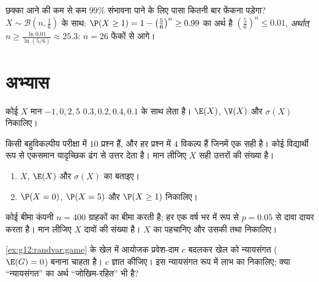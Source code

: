 \begin{example}\label{ex:g12:randvar:atleastone}
छक्का आने की कम से कम $99\%$ संभावना पाने के लिए पासा कितनी बार फेंकना पड़ेगा?
$X \sim \mathcal B\left(n, \frac16\right)$ के साथ: $\P(X \geq 1) = 1 - \left(\frac56\right)^n \geq 0.99$ का अर्थ है $\left(\frac56\right)^n \leq 0.01$, \emph{अर्थात्} $n \geq \frac{\ln 0.01}{\ln(5/6)} \approx 25.3$: $n = 26$ फेंकों से आगे।
\end{example}

\section{अभ्यास}

\begin{exercise}[$\star$]\label{exo:g12:randvar:1}
कोई  $X$ मान $-1, 0, 2, 5$  $0.3, 0.2, 0.4, 0.1$ के साथ लेता है। $\E(X)$, $\V(X)$
और $\sigma(X)$ निकालिए।
\end{exercise}

\begin{exercise}[$\star$]\label{exo:g12:randvar:2}
किसी बहुविकल्पीय परीक्षा में $10$ प्रश्न हैं, और हर प्रश्न में $4$ विकल्प
हैं जिनमें एक सही है। कोई विद्यार्थी  रूप से एकसमान यादृच्छिक ढंग से
उत्तर देता है। मान लीजिए $X$ सही उत्तरों की संख्या है।
\begin{enumerate}
  \item $X$, $\E(X)$ और $\sigma(X)$ का  बताइए।
  \item $\P(X = 0)$, $\P(X = 5)$ और $\P(X \geq 1)$ निकालिए।
\end{enumerate}
\end{exercise}

\begin{exercise}[$\star$]\label{exo:g12:randvar:3}
कोई बीमा कंपनी $n = 400$ ग्राहकों का बीमा करती है; हर एक वर्ष भर में  रूप
से  $p = 0.05$ से दावा दायर करता है। मान लीजिए $X$ दावों की संख्या है।
$X$ का  पहचानिए और उसकी  तथा  निकालिए।
\end{exercise}

\begin{exercise}[$\star\star$]\label{exo:g12:randvar:4}
\cref{ex:g12:randvar:game} के खेल में आयोजक प्रवेश-दाम $c$ बदलकर खेल को न्यायसंगत ($\E(G) = 0$) बनाना
चाहता है। $c$ ज्ञात कीजिए। इस न्यायसंगत रूप में लाभ का  निकालिए; क्या
``न्यायसंगत'' का अर्थ ``जोखिम-रहित'' भी है?
\end{exercise}

